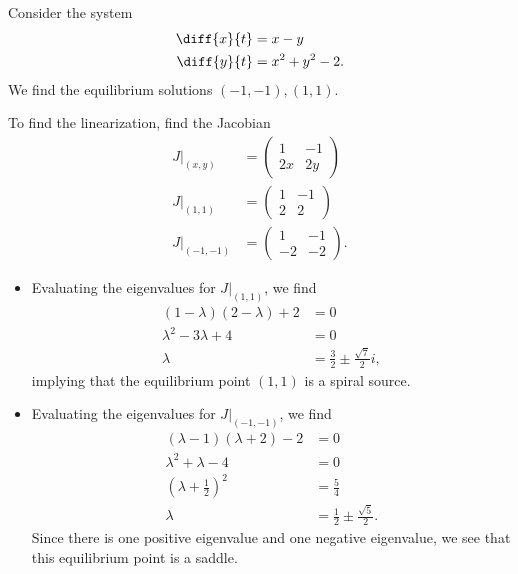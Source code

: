 \documentclass[10pt]{mypackage}
\begin{document}
\begin{example}
  Consider the system
  \begin{align*}
    \diff{x}{t} &= x-y\\
    \diff{y}{t} &= x^2 + y^2 - 2.
  \end{align*}
  We find the equilibrium solutions $\left(-1,-1\right),\left(1,1\right)$.\newline

  To find the linearization, find the Jacobian
  \begin{align*}
    J|_{\left(x,y\right)} &= \begin{pmatrix}1 & -1 \\ 2x & 2y\end{pmatrix}\\
    J|_{\left(1,1\right)} &= \begin{pmatrix}1 & -1 \\ 2 & 2\end{pmatrix}\\
    J|_{\left(-1,-1\right)}  &= \begin{pmatrix}1 & -1 \\ -2 & -2\end{pmatrix}.
  \end{align*}
  \begin{itemize}
    \item Evaluating the eigenvalues for $J|_{\left(1,1\right)}$, we find
      \begin{align*}
        \left(1-\lambda\right)\left(2-\lambda\right) + 2 &= 0\\
        \lambda^2 - 3\lambda + 4 &= 0\\
        \lambda &= \frac{3}{2} \pm \frac{\sqrt{7}}{2}i,
      \end{align*}
      implying that the equilibrium point $\left(1,1\right)$ is a spiral source.
    \item Evaluating the eigenvalues for $J|_{\left(-1,-1\right)}$, we find
      \begin{align*}
        \left(\lambda - 1\right)\left(\lambda + 2\right)- 2 &= 0\\
        \lambda^2 + \lambda - 4 &= 0\\
        \left(\lambda + \frac{1}{2}\right)^2 &= \frac{5}{4}\\
        \lambda &= \frac{1}{2}\pm \frac{\sqrt{5}}{2}.
      \end{align*}
      Since there is one positive eigenvalue and one negative eigenvalue, we see that this equilibrium point is a saddle.
  \end{itemize}

\end{example}
\end{document}

